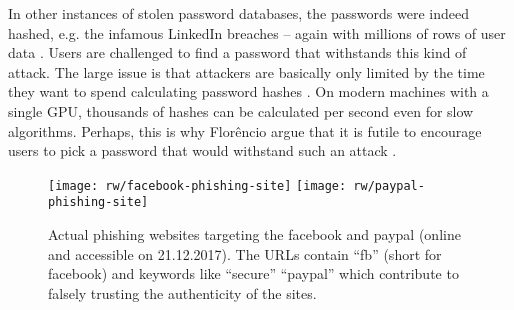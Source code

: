 In other instances of stolen password databases, the passwords were indeed hashed, e.g. the infamous LinkedIn breaches -- again with millions of rows of user data \cite{Huh2017TooBusy}. 
Users are challenged to find a password that withstands this kind of attack. The large issue is that attackers are basically only limited by the time they want to spend calculating password hashes \cite{Block2017EconomicsOfflineCracking}. On modern machines with a single GPU, thousands of hashes can be calculated per second even for slow algorithms. Perhaps, this is why Florêncio \etal argue that it is futile to encourage users to pick a password that would withstand such an attack \cite{Florencio2014AdministratorsGuide, Florencio2016CommACM}. 

\begin{figure}[h!]
	\centering
	\texttt{[image: rw/facebook-phishing-site]}
	\texttt{[image: rw/paypal-phishing-site]}
	\caption{\label{fig:rw:phishingsite} Actual phishing websites targeting the facebook and paypal (online and accessible on 21.12.2017). The URLs contain ``fb'' (short for facebook) and keywords like ``secure'' ``paypal'' which contribute to falsely trusting the authenticity of the sites.}
\end{figure}

